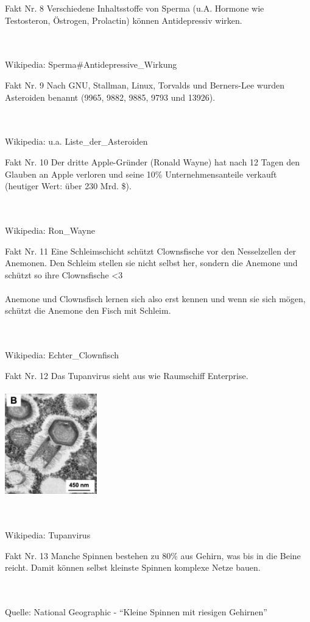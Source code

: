 \documentclass{beamer}
\newenvironment{fakt}[1]
{\begin{frame}{Fakt Nr. #1}\centering}
{\end{frame}}
\newcommand{\rating}[1]{}
\newcommand{\wiki}[1]{\\\hfill\\Wikipedia: #1}
\newcommand{\source}[1]{\\\hfill\\Quelle: #1}
\begin{document}
	\begin{fakt}{8}
		Verschiedene Inhaltsstoffe von Sperma (u.A. Hormone wie Testosteron, Östrogen, Prolactin) können Antidepressiv wirken.
		\rating{9}
		\wiki{Sperma\#Antidepressive\_Wirkung}
	\end{fakt}
	
	\begin{fakt}{9}
		Nach GNU, Stallman, Linux, Torvalds und Berners-Lee wurden Asteroiden benannt (9965, 9882, 9885, 9793 und 13926).
		\rating{6}
		\wiki{u.a. Liste\_der\_Asteroiden}
	\end{fakt}
	
	\begin{fakt}{10}
		Der dritte Apple-Gründer (Ronald Wayne) hat nach 12 Tagen den Glauben an Apple verloren und seine 10\% Unternehmensanteile verkauft (heutiger Wert: über 230 Mrd. \$).
		\rating{10}
		\wiki{Ron\_Wayne}
	\end{fakt}
	
	\begin{fakt}{11}
		Eine Schleimschicht schützt Clownsfische vor den Nesselzellen der Anemonen. Den Schleim stellen sie nicht selbst her, sondern die Anemone und schützt so ihre Clownsfische <3\\
		\hfill\\
		Anemone und Clownsfisch lernen sich also erst kennen und wenn sie sich mögen, schützt die Anemone den Fisch mit Schleim.
		\rating{8}
		\wiki{Echter\_Clownfisch}
	\end{fakt}
	
	\begin{fakt}{12}
		Das Tupanvirus sieht aus wie Raumschiff Enterprise.\\\pause
		\hfill\\
		\includegraphics[width=4cm]{images/Tupanvirus}
		\rating{DS9}
		\wiki{Tupanvirus}
	\end{fakt}
	
	\begin{fakt}{13}
		Manche Spinnen bestehen zu 80\% aus Gehirn, was bis in die Beine reicht. Damit können selbst kleinste Spinnen komplexe Netze bauen.
		\rating{8}
		\source{National Geographic - "`Kleine Spinnen mit riesigen Gehirnen"'}
	\end{fakt}
	
\end{document}
